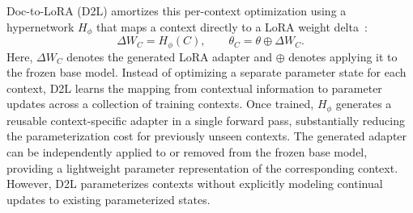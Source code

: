 Doc-to-LoRA (D2L) amortizes this per-context optimization using a hypernetwork $H_\phi$ that maps a context directly to a LoRA weight delta~\citep{hu2022lora,charakorn2026doc}:
\begin{equation}
\Delta W_C=H_\phi(C),\qquad
\theta_C=\theta\oplus\Delta W_C .
\end{equation}
Here, $\Delta W_C$ denotes the generated LoRA adapter and $\oplus$ denotes applying it to the frozen base model.
Instead of optimizing a separate parameter state for each context, D2L learns the mapping from contextual information to parameter updates across a collection of training contexts.
Once trained, $H_\phi$ generates a reusable context-specific adapter in a single forward pass, substantially reducing the parameterization cost for previously unseen contexts.
The generated adapter can be independently applied to or removed from the frozen base model, providing a lightweight parameter representation of the corresponding context.
However, D2L parameterizes contexts without explicitly modeling continual updates to existing parameterized states.